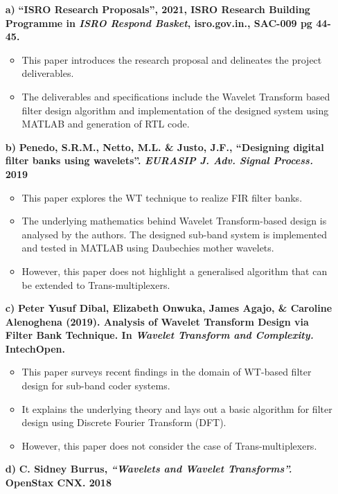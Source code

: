 \begin{enumerate}
\item[\textbf{a)}] \textbf{``ISRO Research Proposals'', 2021, ISRO Research Building Programme in \textit{ISRO Respond Basket}, isro.gov.in., SAC-009 pg 44-45. \cite{b1}}
\begin{itemize}
    \item This paper introduces the research proposal and delineates the project deliverables.
    \item The deliverables and specifications include the Wavelet Transform based filter design algorithm and implementation of the designed system using MATLAB and generation of RTL code.
\end{itemize}
\item[\textbf{b)}] \textbf{Penedo, S.R.M., Netto, M.L. \& Justo, J.F., ``Designing digital filter banks using wavelets''. \textit{EURASIP J. Adv. Signal Process.} 2019 \cite{b2}}
\begin{itemize}
    \item This paper explores the WT technique to realize FIR filter banks.
    \item The underlying mathematics behind Wavelet Transform-based design is  analysed by the authors. The designed sub-band system is implemented and tested in MATLAB using Daubechies mother wavelets.
    \item However, this paper does not highlight a generalised algorithm that can be extended to Trans-multiplexers.
\end{itemize}
\item[\textbf{c)}] \textbf{Peter Yusuf Dibal, Elizabeth Onwuka, James Agajo, \& Caroline Alenoghena (2019). Analysis of Wavelet Transform Design via Filter Bank Technique. In \textit{Wavelet Transform and Complexity.} IntechOpen. \cite{b3}}
\begin{itemize}
    \item This paper surveys recent findings in the domain of WT-based filter design for sub-band coder systems.
    \item It explains the underlying theory and lays out a basic algorithm for filter design using Discrete Fourier Transform (DFT).
    \item However, this paper does not consider the case of Trans-multiplexers.
\end{itemize}
\item[\textbf{d)}] \textbf{C. Sidney Burrus, \textit{``Wavelets and Wavelet Transforms''.} OpenStax CNX. 2018 \cite{b4}}
\begin{itemize}

\end{itemize}
\end{enumerate}
